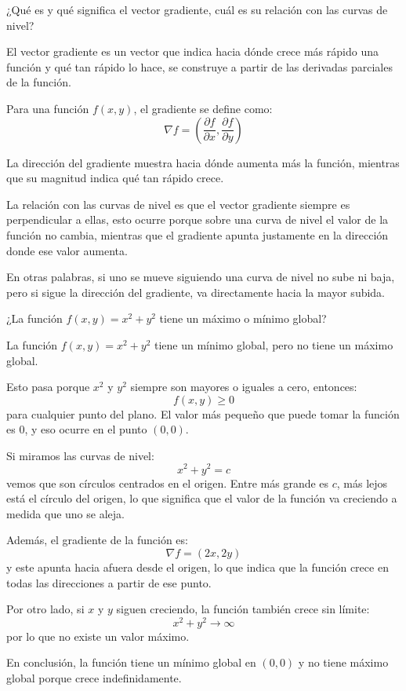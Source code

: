  ¿Qué es y qué significa el vector gradiente, cuál es su relación con las
curvas de nivel?

\begin{respuesta}
El vector gradiente es un vector que indica hacia dónde crece más rápido una función y qué tan rápido lo hace, se construye a partir de las derivadas parciales de la función.

Para una función $f(x,y)$, el gradiente se define como:
\[
\nabla f = \left( \frac{\partial f}{\partial x}, \frac{\partial f}{\partial y} \right)
\]

La dirección del gradiente muestra hacia dónde aumenta más la función, mientras que su magnitud indica qué tan rápido crece.

La relación con las curvas de nivel es que el vector gradiente siempre es perpendicular a ellas, esto ocurre porque sobre una curva de nivel el valor de la función no cambia, mientras que el gradiente apunta justamente en la dirección donde ese valor aumenta.

En otras palabras, si uno se mueve siguiendo una curva de nivel no sube ni baja, pero si sigue la dirección del gradiente, va directamente hacia la mayor subida.
    \vspace{5cm}
\end{respuesta}

 ¿La función $f(x,y) = x^2 + y^2$ tiene un máximo o mínimo global?

\begin{respuesta}
La función $f(x,y) = x^2 + y^2$ tiene un mínimo global, pero no tiene un máximo global.

Esto pasa porque $x^2$ y $y^2$ siempre son mayores o iguales a cero, entonces:
\[
f(x,y) \geq 0
\]
para cualquier punto del plano. El valor más pequeño que puede tomar la función es $0$, y eso ocurre en el punto $(0,0)$.

Si miramos las curvas de nivel:
\[
x^2 + y^2 = c
\]
vemos que son círculos centrados en el origen. Entre más grande es $c$, más lejos está el círculo del origen, lo que significa que el valor de la función va creciendo a medida que uno se aleja.

Además, el gradiente de la función es:
\[
\nabla f = (2x, 2y)
\]
y este apunta hacia afuera desde el origen, lo que indica que la función crece en todas las direcciones a partir de ese punto.

Por otro lado, si $x$ y $y$ siguen creciendo, la función también crece sin límite:
\[
x^2 + y^2 \rightarrow \infty
\]
por lo que no existe un valor máximo.

En conclusión, la función tiene un mínimo global en $(0,0)$ y no tiene máximo global porque crece indefinidamente.
    \vspace{5cm}
\end{respuesta}

